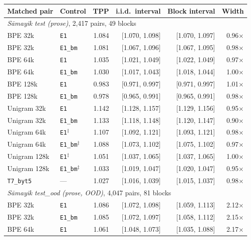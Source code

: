 \begin{table}[t]
\centering
\setlength{\tabcolsep}{4pt}
\scriptsize
\begin{tabular}{llrrrr}
\toprule
Matched pair & Control & TPP & i.i.d.\ interval & Block interval & Width \\
\midrule
\multicolumn{6}{l}{\emph{S\=amayik test (prose)}, 2,417 pairs, 49 blocks} \\
BPE 32k & \texttt{E1} & 1.084 & [1.070, 1.098] & [1.070, 1.097] & 0.96$\times$ \\
BPE 32k & \texttt{E1\_bm} & 1.081 & [1.067, 1.096] & [1.067, 1.095] & 0.98$\times$ \\
BPE 64k & \texttt{E1} & 1.035 & [1.021, 1.049] & [1.022, 1.049] & 0.97$\times$ \\
BPE 64k & \texttt{E1\_bm} & 1.030 & [1.017, 1.043] & [1.018, 1.044] & 1.00$\times$ \\
BPE 128k & \texttt{E1} & 0.983 & [0.971, 0.997] & [0.971, 0.997] & 1.01$\times$ \\
BPE 128k & \texttt{E1\_bm} & 0.978 & [0.965, 0.991] & [0.965, 0.991] & 0.98$\times$ \\
Unigram 32k & \texttt{E1} & 1.142 & [1.128, 1.157] & [1.129, 1.156] & 0.95$\times$ \\
Unigram 32k & \texttt{E1\_bm} & 1.133 & [1.118, 1.148] & [1.120, 1.147] & 0.90$\times$ \\
Unigram 64k & \texttt{E1}$^{\ddagger}$ & 1.107 & [1.092, 1.121] & [1.093, 1.121] & 0.98$\times$ \\
Unigram 64k & \texttt{E1\_bm}$^{\ddagger}$ & 1.088 & [1.073, 1.102] & [1.075, 1.102] & 0.97$\times$ \\
Unigram 128k & \texttt{E1}$^{\ddagger}$ & 1.051 & [1.037, 1.065] & [1.037, 1.065] & 1.00$\times$ \\
Unigram 128k & \texttt{E1\_bm}$^{\ddagger}$ & 1.033 & [1.019, 1.047] & [1.020, 1.047] & 0.95$\times$ \\
\texttt{T7\_byt5} & --- & 1.027 & [1.016, 1.039] & [1.015, 1.037] & 0.98$\times$ \\
\midrule
\multicolumn{6}{l}{\emph{S\=amayik test\_ood (prose, OOD)}, 4,047 pairs, 81 blocks} \\
BPE 32k & \texttt{E1} & 1.086 & [1.072, 1.098] & [1.059, 1.113] & 2.12$\times$ \\
BPE 32k & \texttt{E1\_bm} & 1.085 & [1.072, 1.097] & [1.058, 1.112] & 2.15$\times$ \\
BPE 64k & \texttt{E1} & 1.061 & [1.048, 1.073] & [1.035, 1.088] & 2.17$\times$ \\

\end{tabular}
\end{table}

